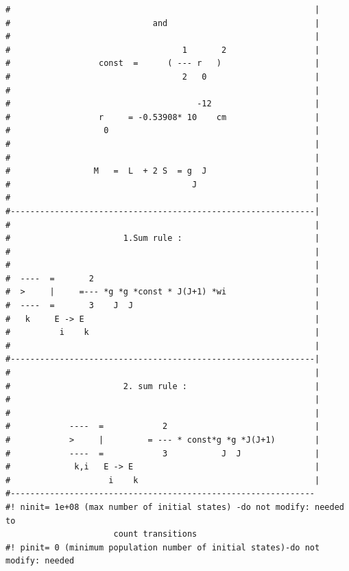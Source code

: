 \begin{enumerate}
{\begin{verbatim}
#                                                              |
#                             and                              |
#                                                              |
#                                   1       2                  |
#                  const  =      ( --- r   )                   |
#                                   2   0                      |
#                                                              |
#                                      -12                     |
#                  r     = -0.53908* 10    cm                  |
#                   0                                          |
#                                                              |
#                                                              |
#                 M   =  L  + 2 S  = g  J                      |
#                                     J                        |
#                                                              |
#--------------------------------------------------------------|
#                                                              |
#                       1.Sum rule :                           |
#                                                              |
#                                                              |
#  ----  =       2                                             |
#  >     |     =--- *g *g *const * J(J+1) *wi                  |
#  ----  =       3    J  J                                     |
#   k     E -> E                                               |
#          i    k                                              |
#                                                              |
#--------------------------------------------------------------|
#                                                              |
#                       2. sum rule :                          |
#                                                              |
#                                                              |
#            ----  =            2                              |
#            >     |         = --- * const*g *g *J(J+1)        |
#            ----  =            3           J  J               |
#             k,i   E -> E                                     |
#                    i    k                                    |
#-------------------------------------------------------------- 
#! ninit= 1e+08 (max number of initial states) -do not modify: needed to 
                      count transitions
#! pinit= 0 (minimum population number of initial states)-do not modify: needed 

\end{verbatim}}
\end{enumerate}
